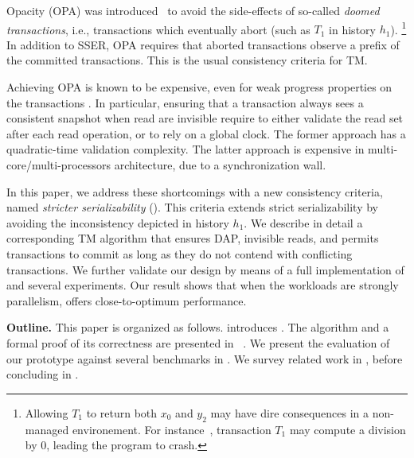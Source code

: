 Opacity (OPA) was introduced~\cite{guerraoui2008correctness} to avoid the side-effects of so-called \emph{doomed transactions}, i.e., transactions which eventually abort (such as $T_1$ in history $h_1$).%
\footnote{  
  Allowing $T_1$ to return both $x_0$ and $y_2$ may have dire consequences in a non-managed environement.
  For instance~\cite{guerraoui2008correctness}, transaction $T_1$ may compute a division by $0$, leading the program to crash.
}
In addition to SSER, OPA requires that aborted transactions observe a prefix of the committed transactions.
This is the usual consistency criteria for TM.

Achieving OPA is known to be expensive, even for weak progress properties on the transactions \cite{}.
In particular, ensuring that a transaction always sees a consistent snapshot when read are invisible require to either validate the read set after each read operation, or to rely on a global clock.
The former approach has a quadratic-time validation complexity.
The latter approach is expensive in multi-core/multi-processors architecture, due to a synchronization wall.

In this paper, we address these shortcomings with a new consistency criteria, named \emph{stricter serializability} (\sser).
This criteria extends strict serializability by avoiding the inconsistency depicted in history $h_1$.
We describe in detail a corresponding TM algorithm that ensures DAP, invisible reads, and permits transactions to commit as long as they do not contend with conflicting transactions.
We further validate our design by means of a full implementation of \sser and several experiments.
Our result shows that when the workloads are strongly parallelism, \sser offers close-to-optimum performance.

\textbf{Outline.}
This paper is organized as follows.
 introduces \sser.
The algorithm and a formal proof of its correctness are presented in ~.
We present the evaluation of our prototype against several benchmarks in .
We survey related work in , before concluding in .
